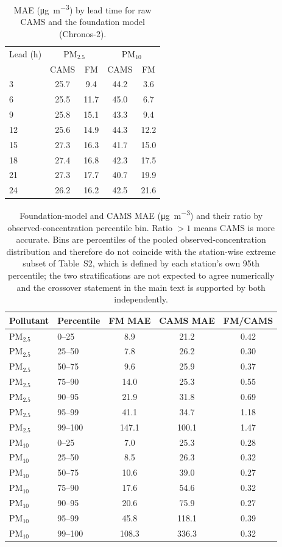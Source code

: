 \documentclass[11pt]{article}
\begin{document}
\begin{table}[htbp]\centering\footnotesize
\caption{MAE (\si{\micro\gram\per\cubic\metre}) by lead time for raw CAMS and the foundation model (Chronos-2).}
\begin{tabular}{lcccc}\toprule
Lead (h) & \multicolumn{2}{c}{PM$_{2.5}$} & \multicolumn{2}{c}{PM$_{10}$} \\
 & CAMS & FM & CAMS & FM \\ \midrule
3 & 25.7 & 9.4 & 44.2 & 3.6 \\
6 & 25.5 & 11.7 & 45.0 & 6.7 \\
9 & 25.8 & 15.1 & 43.3 & 9.4 \\
12 & 25.6 & 14.9 & 44.3 & 12.2 \\
15 & 27.3 & 16.3 & 41.7 & 15.0 \\
18 & 27.4 & 16.8 & 42.3 & 17.5 \\
21 & 27.3 & 17.7 & 40.7 & 19.9 \\
24 & 26.2 & 16.2 & 42.5 & 21.6 \\
\bottomrule\end{tabular}\end{table}

\begin{table}[htbp]\centering\footnotesize
\caption{Foundation-model and CAMS MAE (\si{\micro\gram\per\cubic\metre}) and their ratio by observed-concentration percentile bin. Ratio $>1$ means CAMS is more accurate. Bins are percentiles of the pooled observed-concentration distribution and therefore do not coincide with the station-wise extreme subset of Table~S2, which is defined by each station's own 95th percentile; the two stratifications are not expected to agree numerically and the crossover statement in the main text is supported by both independently.}
\begin{tabular}{llccc}\toprule
Pollutant & Percentile & FM MAE & CAMS MAE & FM/CAMS \\ \midrule
PM$_{2.5}$ & 0--25 & 8.9 & 21.2 & 0.42 \\
PM$_{2.5}$ & 25--50 & 7.8 & 26.2 & 0.30 \\
PM$_{2.5}$ & 50--75 & 9.6 & 25.9 & 0.37 \\
PM$_{2.5}$ & 75--90 & 14.0 & 25.3 & 0.55 \\
PM$_{2.5}$ & 90--95 & 21.9 & 31.8 & 0.69 \\
PM$_{2.5}$ & 95--99 & 41.1 & 34.7 & 1.18 \\
PM$_{2.5}$ & 99--100 & 147.1 & 100.1 & 1.47 \\
PM$_{10}$ & 0--25 & 7.0 & 25.3 & 0.28 \\
PM$_{10}$ & 25--50 & 8.5 & 26.3 & 0.32 \\
PM$_{10}$ & 50--75 & 10.6 & 39.0 & 0.27 \\
PM$_{10}$ & 75--90 & 17.6 & 54.6 & 0.32 \\
PM$_{10}$ & 90--95 & 20.6 & 75.9 & 0.27 \\
PM$_{10}$ & 95--99 & 45.8 & 118.1 & 0.39 \\
PM$_{10}$ & 99--100 & 108.3 & 336.3 & 0.32 \\
\bottomrule\end{tabular}\end{table}
\end{document}
